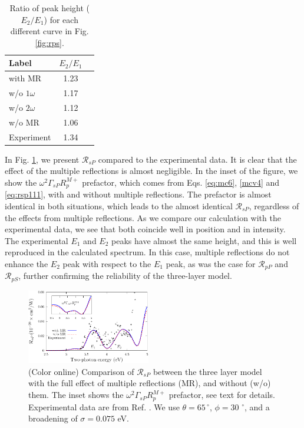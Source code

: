 \documentclass[aps,prb,10pt,showpacs,letterpaper,twocolumn]{revtex4-1}
\begin{document}
\begin{table}[t]
{\color{red}
\caption{Ratio of peak height ($E_{2}/E_{1}$) for each different curve in
Fig. \ref{fig:rps}.}
\label{tab:rpsintensity}
\centering
\begin{tabular}{ | l | c | c | }
\hline
Label           &   $E_{2}/E_{1}$ \\
\hline
with MR         &   1.23          \\
w/o $1\omega$   &   1.17          \\
w/o $2\omega$   &   1.12          \\
w/o MR          &   1.06          \\
Experiment      &   1.34          \\
\hline
\end{tabular}
}
\end{table}

In Fig. \ref{fig:rsp}, we present $\mathcal{R}_{sP}$ compared to the
experimental data. It is clear that the effect of the multiple reflections is
almost negligible. In the inset of the figure, we show the
$\omega^{2}\Gamma_{sP}R^{M+}_{p}$ prefactor, which comes from Eqs.
\eqref{eq:mc6}, \eqref{mcv4} and \eqref{eq:rsp111}, with and without multiple
reflections. The prefactor is almost identical in both situations, which leads
to the almost identical ${\mathcal R}_{sP}$, regardless of the effects from
multiple reflections. As we compare our calculation with the experimental data,
we see that both coincide well in position and in intensity. The experimental
$E_{1}$ and $E_{2}$ peaks have almost the same height, and this is well
reproduced in the calculated spectrum. In this case, multiple reflections do not
enhance the $E_{2}$ peak with respect to the $E_{1}$ peak, as was the case for
$\mathcal{R}_{pP}$ and $\mathcal{R}_{pS}$, further confirming the reliability of
the three-layer model.

\begin{figure}[b]
\includegraphics[width=0.48\textwidth]{fig5}
\caption{(Color online) Comparison of ${\mathcal R}_{sP}$ between the three
layer model with the full effect of multiple reflections (MR), and without (w/o)
them. The inset shows the $\omega^2\Gamma_{sP} R^{M+}_{p}$ prefactor, see text
for details. Experimental data are from Ref. . We use
$\theta = 65\,^{\circ}$, $\phi = 30\,\,^{\circ}$, and a broadening of $\sigma =
0.075$ eV.}
\label{fig:rsp}
\end{figure}
\end{document}
